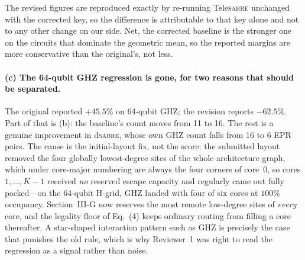 \documentclass[11pt]{article}
\newcommand{\dSABRE}{d\textsc{sabre}}
\newcommand{\TeleSABRE}{Tele\textsc{sabre}}
\begin{document}
\noindent
The revised figures are reproduced exactly by re-running \TeleSABRE{}
unchanged with the corrected key, so the difference is attributable to that
key alone and not to any other change on our side. Net, the corrected baseline
is the stronger one on the circuits that dominate the geometric mean, so the
reported margins are more conservative than the original's, not less.

\paragraph{(c) The 64-qubit GHZ regression is gone, for two reasons that
should be separated.}
The original reported $+45.5\%$ on 64-qubit GHZ; the revision reports
$-62.5\%$. Part of that is (b): the baseline's count moves from 11 to 16.
The rest is a genuine improvement in \dSABRE{}, whose own GHZ count falls from
16 to 6 EPR pairs. The cause is the initial-layout fix, not the score: the
submitted layout removed the four globally lowest-degree sites of the whole
architecture graph, which under core-major numbering are always the four
corners of core~0, so cores $1,\dots,K-1$ received \emph{no} reserved escape
capacity and regularly came out fully packed---on the 64-qubit H-grid, GHZ
landed with four of six cores at $100\%$ occupancy. Section~III-G now reserves
the most remote low-degree sites of \emph{every} core, and the legality floor
of Eq.~(4) keeps ordinary routing from filling a core thereafter. A star-shaped
interaction pattern such as GHZ is precisely the case that punishes the old
rule, which is why Reviewer~1 was right to read the regression as a signal
rather than noise.
\end{document}
